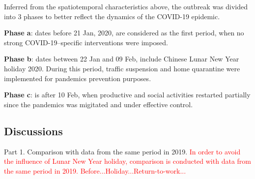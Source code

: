 \documentclass[preprints,ijgi,submit,moreauthors]{Definitions/mdpi}
\begin{document}
Inferred from the spatiotemporal characteristics above, the outbreak was divided into 3 phases to better reflect the dynamics of the COVID-19 epidemic.

\textbf{Phase a}: dates before 21 Jan, 2020, are considered as the first period, when no strong COVID-19–specific interventions were imposed.

\textbf{Phase b}: dates between 22 Jan and 09 Feb, include Chinese Lunar New Year holiday 2020. During this period, traffic suspension and home quarantine were implemented for pandemics prevention purposes.

\textbf{Phase c}: is after 10 Feb, when productive and social activities restarted partially since the pandemics was migitated and under effective control.

\subsection{Discussions}
Part 1. Comparison with data from the same period in 2019.
\textcolor{red}{In order to avoid the influence of Lunar New Year holiday, comparison is conducted with data from the same period in 2019. Before...Holiday...Return-to-work...}
\end{document}
